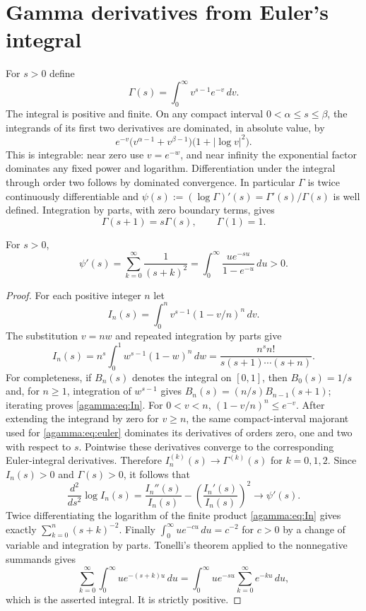 \section{Gamma derivatives from Euler's integral}\label{agamma:sec:derivatives}
For $s>0$ define
\begin{equation}\label{agamma:eq:euler}
\Gamma(s)=\int_0^\infty v^{s-1}e^{-v}\,dv.
\end{equation}
The integral is positive and finite. On any compact interval
$0<\alpha\le s\le\beta$, the integrands of its first two derivatives
are dominated, in absolute value, by
\[
e^{-v}\bigl(v^{\alpha-1}+v^{\beta-1}\bigr)
\bigl(1+|\log v|^2\bigr).
\]
This is integrable: near zero use $v=e^{-w}$, and near infinity the
exponential factor dominates any fixed power and logarithm.
Differentiation under the integral through order two follows by
dominated convergence. In particular $\Gamma$ is twice continuously
differentiable and
$\psi(s):=(\log\Gamma)'(s)=\Gamma'(s)/\Gamma(s)$ is well defined.
Integration by parts, with zero boundary terms, gives
\begin{equation}\label{agamma:eq:recurrence}
\Gamma(s+1)=s\Gamma(s),\qquad \Gamma(1)=1.
\end{equation}

\begin{agammalemma}\label{agamma:lem:trigamma}
For $s>0$,
\begin{equation}\label{agamma:eq:trigamma}
\psi'(s)=\sum_{k=0}^\infty\frac1{(s+k)^2}
=\int_0^\infty\frac{u e^{-su}}{1-e^{-u}}\,du>0.
\end{equation}
\end{agammalemma}
\begin{proof}
For each positive integer $n$ let
\[
I_n(s)=\int_0^n v^{s-1}(1-v/n)^n\,dv.
\]
The substitution $v=nw$ and repeated integration by parts give
\begin{equation}\label{agamma:eq:In}
I_n(s)=n^s\int_0^1 w^{s-1}(1-w)^n\,dw
=\frac{n^s n!}{s(s+1)\cdots(s+n)}.
\end{equation}
For completeness, if $B_n(s)$ denotes the integral on $[0,1]$, then
$B_0(s)=1/s$ and, for $n\ge1$, integration of $w^{s-1}$ gives
$B_n(s)=(n/s)B_{n-1}(s+1)$; iterating proves \eqref{agamma:eq:In}.
For $0<v<n$, $(1-v/n)^n\le e^{-v}$. After extending the integrand
by zero for $v\ge n$, the same compact-interval majorant used for
\eqref{agamma:eq:euler} dominates its derivatives of orders zero, one and two
with respect to $s$. Pointwise these derivatives converge to the
corresponding Euler-integral derivatives. Therefore
$I_n^{(k)}(s)\to\Gamma^{(k)}(s)$ for $k=0,1,2$.
Since $I_n(s)>0$ and $\Gamma(s)>0$, it follows that
\[
\frac{d^2}{ds^2}\log I_n(s)
=\frac{I_n''(s)}{I_n(s)}-
\left(\frac{I_n'(s)}{I_n(s)}\right)^2
\longrightarrow\psi'(s).
\]
Twice differentiating the logarithm of the finite product
\eqref{agamma:eq:In} gives exactly $\sum_{k=0}^n(s+k)^{-2}$.
Finally $\int_0^\infty u e^{-cu}\,du=c^{-2}$ for $c>0$ by a change
of variable and integration by parts. Tonelli's theorem applied to
the nonnegative summands gives
\[
\sum_{k=0}^\infty\int_0^\infty u e^{-(s+k)u}\,du
=\int_0^\infty u e^{-su}\sum_{k=0}^\infty e^{-ku}\,du,
\]
which is the asserted integral. It is strictly positive.
\end{proof}

